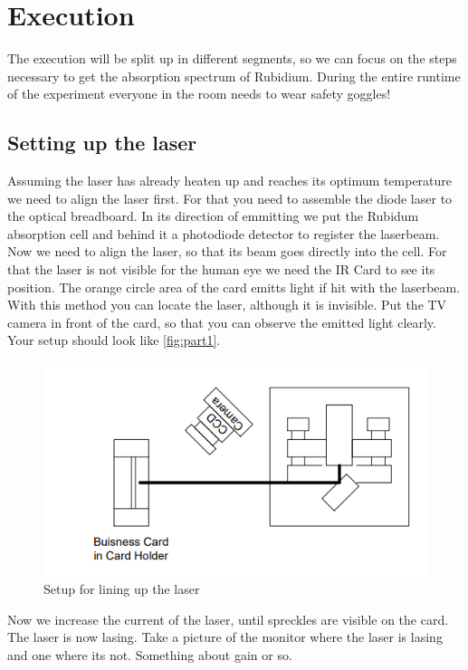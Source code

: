 \section{Execution}
\label{sec:Execution}

The execution will be split up in different segments, so we can focus on the steps necessary to get the absorption spectrum of Rubidium.
During the entire runtime of the experiment everyone in the room needs to wear safety goggles!

\subsection{Setting up the laser}
\label{ssec:exe1}

Assuming the laser has already heaten up and reaches its optimum temperature we need to align the laser first.
For that you need to assemble the diode laser to the optical breadboard.
In its direction of emmitting we put the Rubidum absorption cell and behind it a photodiode detector to register the laserbeam.
Now we need to align the laser, so that its beam goes directly into the cell.
For that the laser is not visible for the human eye we need the IR Card to see its position. 
The orange circle area of the card emitts light if hit with the laserbeam. 
With this method you can locate the laser, although it is invisible.
Put the TV camera in front of the card, so that you can observe the emitted light clearly.
Your setup should look like \autoref{fig:part1}.
\begin{figure}
    \centering
    \includegraphics[width=\textwidth]{images/part1.png}
    \caption{Setup for lining up the laser \cite{V60}}
    \label{fig:part1}
\end{figure}
Now we increase the current of the laser, until spreckles are visible on the card. 
The laser is now lasing. 
Take a picture of the monitor where the laser is lasing and one where its not.
Something about gain or so.

